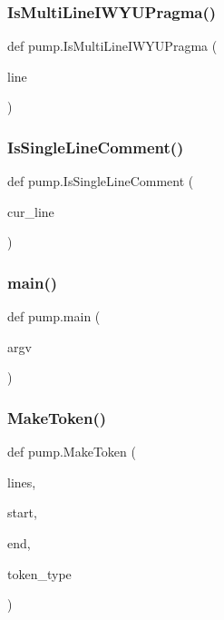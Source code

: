 \mbox{\label{namespacepump_a707a3ff4514c89607e48a87589aed787}} 
\subsubsection{\texorpdfstring{Is\+Multi\+Line\+I\+W\+Y\+U\+Pragma()}{IsMultiLineIWYUPragma()}}
{\footnotesize\ttfamily def pump.\+Is\+Multi\+Line\+I\+W\+Y\+U\+Pragma (\begin{DoxyParamCaption}\item[{}]{line }\end{DoxyParamCaption})}

\mbox{\label{namespacepump_a417078b1d036b67756c47e5dc50324dc}} 
\subsubsection{\texorpdfstring{Is\+Single\+Line\+Comment()}{IsSingleLineComment()}}
{\footnotesize\ttfamily def pump.\+Is\+Single\+Line\+Comment (\begin{DoxyParamCaption}\item[{}]{cur\+\_\+line }\end{DoxyParamCaption})}

\mbox{\label{namespacepump_abcf26971f7bdbad77c2c168c110312df}} 
\subsubsection{\texorpdfstring{main()}{main()}}
{\footnotesize\ttfamily def pump.\+main (\begin{DoxyParamCaption}\item[{}]{argv }\end{DoxyParamCaption})}

\mbox{\label{namespacepump_af96d60dc97b160f3a18e63857aabeef7}} 
\subsubsection{\texorpdfstring{Make\+Token()}{MakeToken()}}
{\footnotesize\ttfamily def pump.\+Make\+Token (\begin{DoxyParamCaption}\item[{}]{lines,  }\item[{}]{start,  }\item[{}]{end,  }\item[{}]{token\+\_\+type }\end{DoxyParamCaption})}


